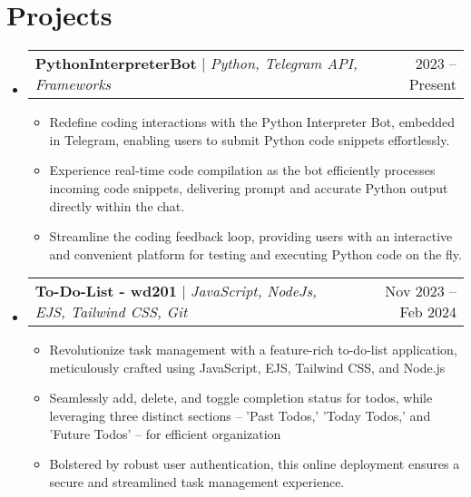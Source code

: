 \documentclass[letterpaper,11pt]{article}
\makeatletter
\newcommand{\resumeItem}[1]{
  \item\small{
    {#1 \vspace{-2pt}}
  }
}
\newcommand{\resumeSubheading}[4]{
  \vspace{-2pt}\item
    \begin{tabular*}{0.97\textwidth}[t]{l@{\extracolsep{\fill}}r}
      \textbf{#1} & #2 \\
      \textit{\small#3} & \textit{\small #4} \\
    \end{tabular*}\vspace{-7pt}
}
\newcommand{\resumeProjectHeading}[2]{
    \item
    \begin{tabular*}{0.97\textwidth}{l@{\extracolsep{\fill}}r}
      \small#1 & #2 \\
    \end{tabular*}\vspace{-7pt}
}
\newcommand{\resumeSubHeadingListStart}{\begin{itemize}[leftmargin=0.15in, label={}]}
\newcommand{\resumeSubHeadingListEnd}{\end{itemize}}
\newcommand{\resumeItemListStart}{\begin{itemize}}
\newcommand{\resumeItemListEnd}{\end{itemize}\vspace{-5pt}}
\makeatother
\begin{document}




\section{Projects}
    \resumeSubHeadingListStart
      \resumeProjectHeading
          {\textbf{PythonInterpreterBot} $|$ \emph{Python, Telegram API, Frameworks}}{2023 -- Present}
        \resumeItemListStart
        \resumeItem{Redefine coding interactions with the Python Interpreter Bot, embedded in Telegram, enabling users to submit Python code snippets effortlessly.}
        \resumeItem{Experience real-time code compilation as the bot efficiently processes incoming code snippets, delivering prompt and accurate Python output directly within the chat.}
        \resumeItem{Streamline the coding feedback loop, providing users with an interactive and convenient platform for testing and executing Python code on the fly.}
    \resumeItemListEnd
      \resumeProjectHeading
          {\textbf{To-Do-List - wd201} $|$ \emph{JavaScript, NodeJs, EJS, Tailwind CSS, Git}}{Nov 2023 -- Feb 2024}
          \resumeItemListStart
        \resumeItem{Revolutionize task management with a feature-rich to-do-list application, meticulously crafted using JavaScript, EJS, Tailwind CSS, and Node.js}
        \resumeItem{Seamlessly add, delete, and toggle completion status for todos, while leveraging three distinct sections – 'Past Todos,' 'Today Todos,' and 'Future Todos' – for efficient organization} 
        \resumeItem{Bolstered by robust user authentication, this online deployment ensures a secure and streamlined task management experience.}
          \resumeItemListEnd
    \resumeSubHeadingListEnd
\end{document}
